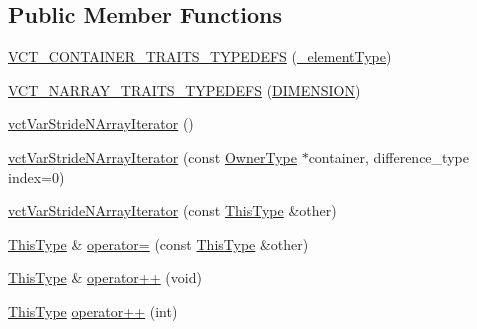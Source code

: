\subsection*{Public Member Functions}
\begin{DoxyCompactItemize}
\item 
\hyperlink{classvct_var_stride_n_array_iterator_ad5e114d1d3da325f97d3d7efc39404bf}{V\+C\+T\+\_\+\+C\+O\+N\+T\+A\+I\+N\+E\+R\+\_\+\+T\+R\+A\+I\+T\+S\+\_\+\+T\+Y\+P\+E\+D\+E\+F\+S} (\hyperlink{classvct_var_stride_n_array_const_iterator_adb02654cc147e6ce3ceef03ebe78c4e2}{\+\_\+element\+Type})
\item 
\hyperlink{classvct_var_stride_n_array_iterator_aaad1ecdc19f3ad0afffbaf40bf30f3d4}{V\+C\+T\+\_\+\+N\+A\+R\+R\+A\+Y\+\_\+\+T\+R\+A\+I\+T\+S\+\_\+\+T\+Y\+P\+E\+D\+E\+F\+S} (\hyperlink{classvct_var_stride_n_array_iterator_a982bcef37bef37c57993bcf62f572b53ada81b91fee86d82f21804a797bc37cdb}{D\+I\+M\+E\+N\+S\+I\+O\+N})
\item 
\hyperlink{classvct_var_stride_n_array_iterator_a0b0e30edc9d10483327a9eb38df14fad}{vct\+Var\+Stride\+N\+Array\+Iterator} ()
\item 
\hyperlink{classvct_var_stride_n_array_iterator_a34d40e5244854d85a735ac0b304e5275}{vct\+Var\+Stride\+N\+Array\+Iterator} (const \hyperlink{classvct_var_stride_n_array_const_iterator_ac75d53a8defeee467ba9ebe2962e29ac}{Owner\+Type} $\ast$container, difference\+\_\+type index=0)
\item 
\hyperlink{classvct_var_stride_n_array_iterator_ae78e2919cf40d4076107177a2536993b}{vct\+Var\+Stride\+N\+Array\+Iterator} (const \hyperlink{classvct_var_stride_n_array_const_iterator_ac729d2af265785aad6fdd43a70fbffdb}{This\+Type} \&other)
\item 
\hyperlink{classvct_var_stride_n_array_const_iterator_ac729d2af265785aad6fdd43a70fbffdb}{This\+Type} \& \hyperlink{classvct_var_stride_n_array_iterator_a947f9b8c6b4bd2d62df50a2b55ddea74}{operator=} (const \hyperlink{classvct_var_stride_n_array_const_iterator_ac729d2af265785aad6fdd43a70fbffdb}{This\+Type} \&other)
\item 
\hyperlink{classvct_var_stride_n_array_const_iterator_ac729d2af265785aad6fdd43a70fbffdb}{This\+Type} \& \hyperlink{classvct_var_stride_n_array_iterator_ae9fba3f494b57cac90808f70244eefea}{operator++} (void)
\item 
\hyperlink{classvct_var_stride_n_array_const_iterator_ac729d2af265785aad6fdd43a70fbffdb}{This\+Type} \hyperlink{classvct_var_stride_n_array_iterator_aaec75b6343eb41a93213fea79dc51dd3}{operator++} (int)

\end{DoxyCompactItemize}
